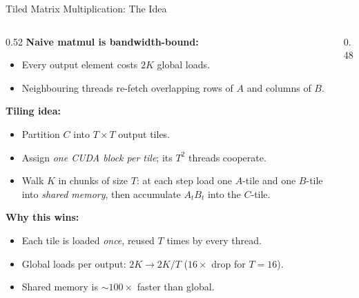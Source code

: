 \begin{frame}{Tiled Matrix Multiplication: The Idea}
\begin{columns}[T]
  \begin{column}{0.52\textwidth}
    \textbf{Naive matmul is bandwidth-bound:}
    \begin{itemize}\itemsep0.15em
      \item Every output element costs $2K$ global loads.
      \item Neighbouring threads re-fetch overlapping rows of $A$ and columns of $B$.
    \end{itemize}

    \vspace{0.4em}
    \textbf{Tiling idea:}
    \begin{itemize}\itemsep0.15em
      \item Partition $C$ into $T \times T$ output tiles.
      \item Assign \emph{one CUDA block per tile}; its $T^2$ threads cooperate.
      \item Walk $K$ in chunks of size $T$: at each step load one $A$-tile and one $B$-tile into \emph{shared memory}, then accumulate $A_t B_t$ into the $C$-tile.
    \end{itemize}

    \vspace{0.4em}
    \textbf{Why this wins:}
    \begin{itemize}\itemsep0.15em
      \item Each tile is loaded \emph{once}, reused $T$ times by every thread.
      \item Global loads per output: $2K \to 2K/T$ ($16\times$ drop for $T{=}16$).
      \item Shared memory is ${\sim}100\times$ faster than global.
    \end{itemize}
  \end{column}

  \begin{column}{0.48\textwidth}
    \centering
\end{column}
\end{columns}
\end{frame}
